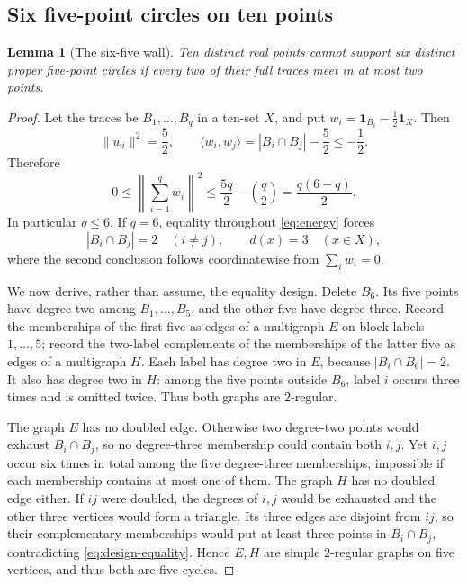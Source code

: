 \documentclass[11pt]{article}
\newtheorem{lemma}[theorem]{Lemma}
\theoremstyle{definition}
\theoremstyle{remark}
\newcommand{\one}{\mathbf 1}
\begin{document}
\subsection{Six five-point circles on ten points}

\begin{lemma}[The six-five wall]\label{lem:six-five}
Ten distinct real points cannot support six distinct proper five-point
circles if every two of their full traces meet in at most two points.
\end{lemma}

\begin{proof}
Let the traces be \(B_1,\ldots,B_q\) in a ten-set \(X\), and put
\(w_i=\one_{B_i}-\tfrac12\one_X\).  Then
\[
 \|w_i\|^2=\frac52,\qquad
 \langle w_i,w_j\rangle=|B_i\cap B_j|-\frac52\leq-\frac12.
\]
Therefore
\begin{equation}\label{eq:energy}
 0\leq\left\|\sum_{i=1}^q w_i\right\|^2
 \leq\frac{5q}{2}-\binom q2=\frac{q(6-q)}2.
\end{equation}
In particular \(q\leq6\).  If \(q=6\), equality throughout
\eqref{eq:energy} forces
\begin{equation}\label{eq:design-equality}
 |B_i\cap B_j|=2\quad(i\neq j),
 \qquad d(x)=3\quad(x\in X),
\end{equation}
where the second conclusion follows coordinatewise from
\(\sum_iw_i=0\).

We now derive, rather than assume, the equality design.  Delete \(B_6\).
Its five points have degree two among \(B_1,\ldots,B_5\), and the other five
have degree three.  Record the memberships of the first five as edges of a
multigraph \(E\) on block labels \(1,\ldots,5\); record the two-label
complements of the memberships of the latter five as edges of a multigraph
\(H\).  Each label has degree two in \(E\), because
\(|B_i\cap B_6|=2\).  It also has degree two in \(H\): among the five
points outside \(B_6\), label \(i\) occurs three times and is omitted twice.
Thus both graphs are \(2\)-regular.

The graph \(E\) has no doubled edge.  Otherwise two degree-two points would
exhaust \(B_i\cap B_j\), so no degree-three membership could contain both
\(i,j\).  Yet \(i,j\) occur six times in total among the five degree-three
memberships, impossible if each membership contains at most one of them.
The graph \(H\) has no doubled edge either.  If \(ij\) were doubled, the
degrees of \(i,j\) would be exhausted and the other three vertices would
form a triangle.  Its three edges are disjoint from \(ij\), so their
complementary memberships would put at least three points in
\(B_i\cap B_j\), contradicting \eqref{eq:design-equality}.  Hence \(E,H\)
are simple \(2\)-regular graphs on five vertices, and thus both are
five-cycles.


\end{proof}
\end{document}
